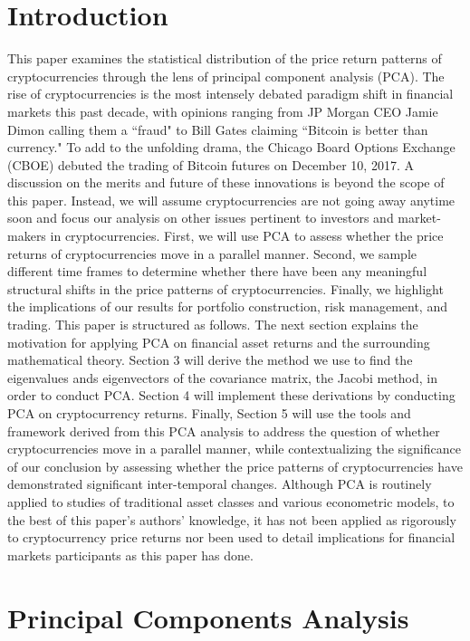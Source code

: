 \documentclass[12pt,twoside]{article}
\begin{document}
\newpage
\tableofcontents
\newpage
\setlength{\parindent}{0cm}
\section{Introduction}
This paper examines the statistical distribution of the price return patterns of cryptocurrencies through the lens of principal component analysis (PCA). The rise of cryptocurrencies is the most intensely debated paradigm shift in financial markets this past decade, with opinions ranging from JP Morgan CEO Jamie Dimon calling them a ``fraud" to Bill Gates claiming ``Bitcoin is better than currency." To add to the unfolding drama, the Chicago Board Options Exchange (CBOE) debuted the trading of Bitcoin futures on December 10, 2017. A discussion on the merits and future of these innovations is beyond the scope of this paper.
\bigbreak
Instead, we will assume cryptocurrencies are not going away anytime soon and focus our analysis on other issues pertinent to investors and market-makers in cryptocurrencies. First, we will use PCA to assess whether the price returns of cryptocurrencies move in a parallel manner. Second, we sample different time frames to determine whether there have been any meaningful structural shifts in the price patterns of cryptocurrencies. Finally, we highlight the implications of our results for portfolio construction, risk management, and trading.
\bigbreak
This paper is structured as follows. The next section explains the motivation for applying PCA on financial asset returns and the surrounding mathematical theory. Section 3 will derive the method we use to find the eigenvalues ands eigenvectors of the covariance matrix, the Jacobi method, in order to conduct PCA. Section 4 will implement these derivations by conducting PCA on cryptocurrency returns. Finally, Section 5 will use the tools and framework derived from this PCA analysis to address the question of whether cryptocurrencies move in a parallel manner, while contextualizing the significance of our conclusion by assessing whether the price patterns of cryptocurrencies have demonstrated significant inter-temporal changes. Although PCA is routinely applied to studies of traditional asset classes and various econometric models, to the best of this paper's authors' knowledge, it has not been applied as rigorously to cryptocurrency price returns nor been used to detail implications for financial markets participants as this paper has done.


\section{Principal Components Analysis}
\end{document}
